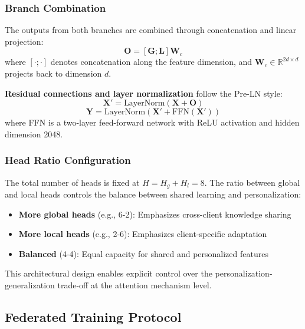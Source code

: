 \subsubsection{Branch Combination}

The outputs from both branches are combined through concatenation and linear projection:
\begin{equation}
\mathbf{O} = [\mathbf{G}; \mathbf{L}] \mathbf{W}_c
\end{equation}
where $[\cdot; \cdot]$ denotes concatenation along the feature dimension, and $\mathbf{W}_c \in \mathbb{R}^{2d \times d}$ projects back to dimension $d$.

\textbf{Residual connections and layer normalization} follow the Pre-LN style:
\begin{equation}
\mathbf{X}' = \text{LayerNorm}(\mathbf{X} + \mathbf{O})
\end{equation}
\begin{equation}
\mathbf{Y} = \text{LayerNorm}(\mathbf{X}' + \text{FFN}(\mathbf{X}'))
\end{equation}
where FFN is a two-layer feed-forward network with ReLU activation and hidden dimension 2048.

\subsubsection{Head Ratio Configuration}

The total number of heads is fixed at $H = H_g + H_l = 8$. The ratio between global and local heads controls the balance between shared learning and personalization:
\begin{itemize}
    \item \textbf{More global heads} (e.g., 6-2): Emphasizes cross-client knowledge sharing
    \item \textbf{More local heads} (e.g., 2-6): Emphasizes client-specific adaptation
    \item \textbf{Balanced} (4-4): Equal capacity for shared and personalized features
\end{itemize}

This architectural design enables explicit control over the personalization-generalization trade-off at the attention mechanism level.

\subsection{Federated Training Protocol}

